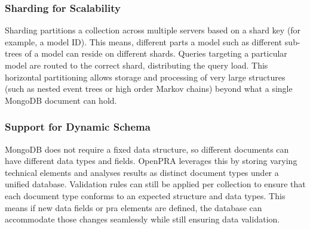 \subsubsection{Sharding for Scalability}

Sharding partitions a collection across multiple servers based on a shard key (for example, a model ID). This means, different parts a model such as different sub-trees of a model can reside on different shards. Queries targeting a particular model are routed to the correct shard, distributing the query load. This horizontal partitioning allows storage and processing of very large structures (such as nested event trees or high order Markov chains) beyond what a single MongoDB document can hold.

\subsubsection{Support for Dynamic Schema}

MongoDB does not require a fixed data structure, so different documents can have different data types and fields. OpenPRA leverages this by storing varying technical elements and analyses results as distinct document types under a unified database. Validation rules can still be applied per collection to ensure that each document type conforms to an expected structure and data types. This means if new data fields or \acrshort{pra} elements are defined, the database can accommodate those changes seamlessly while still ensuring data validation.